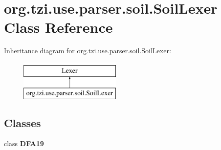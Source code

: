 \hypertarget{classorg_1_1tzi_1_1use_1_1parser_1_1soil_1_1_soil_lexer}{\section{org.\-tzi.\-use.\-parser.\-soil.\-Soil\-Lexer Class Reference}
\label{classorg_1_1tzi_1_1use_1_1parser_1_1soil_1_1_soil_lexer}
}
Inheritance diagram for org.\-tzi.\-use.\-parser.\-soil.\-Soil\-Lexer\-:\begin{figure}[H]
\begin{center}
\leavevmode
\includegraphics[height=2.000000cm]{classorg_1_1tzi_1_1use_1_1parser_1_1soil_1_1_soil_lexer}
\end{center}
\end{figure}
\subsection*{Classes}
\begin{DoxyCompactItemize}
\item 
class {\bfseries D\-F\-A19}
\end{DoxyCompactItemize}
